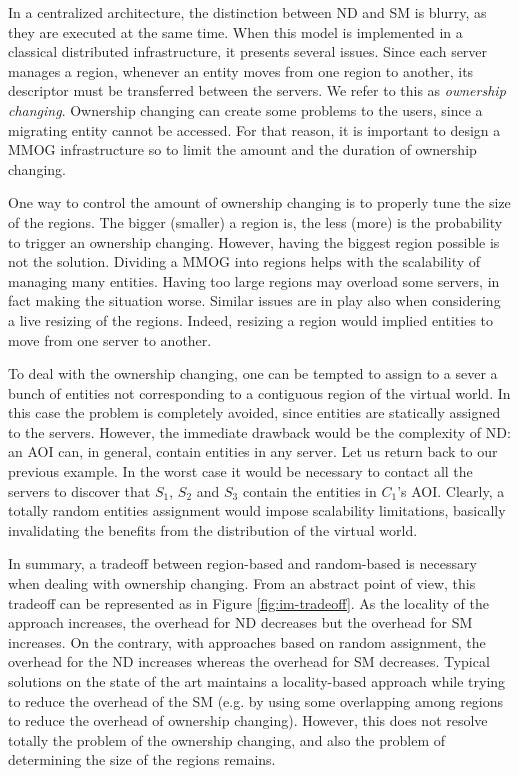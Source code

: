 \documentclass[final,10pt,a5paper]{phdimt}
\theoremstyle{definition}
\begin{document}
In a centralized architecture, the distinction between ND and SM is blurry, as they are executed at the same time.
When this model is implemented in a classical distributed infrastructure, it presents several issues.
Since each server manages a region, whenever an entity moves from one region to another, its descriptor must be transferred between the servers.
We refer to this as \textit{ownership changing}. 
Ownership changing can create some problems to the users, since a migrating entity cannot be accessed. 
For that reason, it is important to design a MMOG infrastructure so to limit the amount and the duration of ownership changing.


One way to control the amount of ownership changing is to properly tune the size of the regions.
The bigger (smaller) a region is, the less (more) is the probability to trigger an ownership changing. 
However, having the biggest region possible is not the solution. 
Dividing a MMOG into regions helps with the scalability of managing many entities.
Having too large regions may overload some servers, in fact making the situation worse.
Similar issues are in play also when considering a live resizing of the regions.
Indeed, resizing a region would implied entities to move from one server to another.


To deal with the ownership changing, one can be tempted to assign to a sever a bunch of entities not corresponding to a contiguous region of the virtual world.
In this case the problem is completely avoided, since entities are statically assigned to the servers.
However, the immediate drawback would be the complexity of ND: an AOI can, in general, contain entities in any server.
Let us return back to our previous example. 
In the worst case it would be necessary to contact all the servers to discover that $S_1$, $S_2$ and $S_3$ contain the entities in $C_1$'s AOI. 
Clearly, a totally random entities assignment would impose scalability limitations, basically invalidating the benefits from the distribution of the virtual world.

In summary, a tradeoff between region-based and random-based is necessary when dealing with ownership changing.
From an abstract point of view, this tradeoff can be represented as in Figure \ref{fig:im-tradeoff}.
As the locality of the approach increases, the overhead for ND decreases but the overhead for SM increases.
On the contrary, with approaches based on random assignment, the overhead for the ND increases whereas the overhead for SM decreases. 
Typical solutions on the state of the art maintains a locality-based approach while trying to reduce the overhead of the SM (e.g. by using some overlapping among regions to reduce the overhead of ownership changing). However, this does not resolve totally the problem of the ownership changing, and also the problem of determining the size of the regions remains. 
\end{document}

